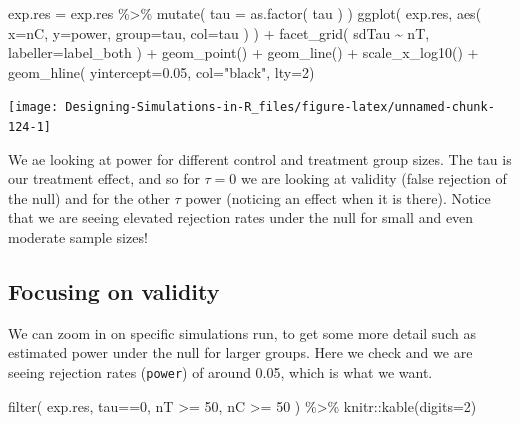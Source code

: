 \documentclass[
]{book}
\newenvironment{Shaded}{\begin{snugshade}}{\end{snugshade}}
\newcommand{\AttributeTok}[1]{\textcolor[rgb]{0.77,0.63,0.00}{#1}}
\newcommand{\DecValTok}[1]{\textcolor[rgb]{0.00,0.00,0.81}{#1}}
\newcommand{\FloatTok}[1]{\textcolor[rgb]{0.00,0.00,0.81}{#1}}
\newcommand{\FunctionTok}[1]{\textcolor[rgb]{0.00,0.00,0.00}{#1}}
\newcommand{\NormalTok}[1]{#1}
\newcommand{\OtherTok}[1]{\textcolor[rgb]{0.56,0.35,0.01}{#1}}
\newcommand{\SpecialCharTok}[1]{\textcolor[rgb]{0.00,0.00,0.00}{#1}}
\newcommand{\StringTok}[1]{\textcolor[rgb]{0.31,0.60,0.02}{#1}}
\begin{document}
\begin{Shaded}
\begin{Highlighting}[]
\NormalTok{exp.res }\OtherTok{=}\NormalTok{ exp.res }\SpecialCharTok{\%\textgreater{}\%} \FunctionTok{mutate}\NormalTok{( }\AttributeTok{tau =} \FunctionTok{as.factor}\NormalTok{( tau ) )}
\FunctionTok{ggplot}\NormalTok{( exp.res, }\FunctionTok{aes}\NormalTok{( }\AttributeTok{x=}\NormalTok{nC, }\AttributeTok{y=}\NormalTok{power, }\AttributeTok{group=}\NormalTok{tau, }\AttributeTok{col=}\NormalTok{tau ) ) }\SpecialCharTok{+}
  \FunctionTok{facet\_grid}\NormalTok{( sdTau }\SpecialCharTok{\textasciitilde{}}\NormalTok{ nT, }\AttributeTok{labeller=}\NormalTok{label\_both ) }\SpecialCharTok{+}
  \FunctionTok{geom\_point}\NormalTok{() }\SpecialCharTok{+} \FunctionTok{geom\_line}\NormalTok{() }\SpecialCharTok{+}
  \FunctionTok{scale\_x\_log10}\NormalTok{() }\SpecialCharTok{+}
  \FunctionTok{geom\_hline}\NormalTok{( }\AttributeTok{yintercept=}\FloatTok{0.05}\NormalTok{, }\AttributeTok{col=}\StringTok{"black"}\NormalTok{, }\AttributeTok{lty=}\DecValTok{2}\NormalTok{)}
\end{Highlighting}
\end{Shaded}

\begin{center}\texttt{[image: Designing-Simulations-in-R\_files/figure-latex/unnamed-chunk-124-1]} \end{center}

We ae looking at power for different control and treatment group sizes. The tau is our treatment effect, and so for \(\tau = 0\) we are looking at validity (false rejection of the null) and for the other \(\tau\) power (noticing an effect when it is there).
Notice that we are seeing elevated rejection rates under the null for small and even moderate sample sizes!

\hypertarget{focusing-on-validity}{%
\subsection{Focusing on validity}\label{focusing-on-validity}}

We can zoom in on specific simulations run, to get some more detail
such as estimated power under the null for larger groups. Here we check
and we are seeing rejection rates (\texttt{power}) of around 0.05, which is what we want.

\begin{Shaded}
\begin{Highlighting}[]
\FunctionTok{filter}\NormalTok{( exp.res, tau}\SpecialCharTok{==}\DecValTok{0}\NormalTok{, nT }\SpecialCharTok{\textgreater{}=} \DecValTok{50}\NormalTok{, nC }\SpecialCharTok{\textgreater{}=} \DecValTok{50}\NormalTok{ ) }\SpecialCharTok{\%\textgreater{}\%}
\NormalTok{  knitr}\SpecialCharTok{::}\FunctionTok{kable}\NormalTok{(}\AttributeTok{digits=}\DecValTok{2}\NormalTok{)}
\end{Highlighting}
\end{Shaded}
\end{document}
